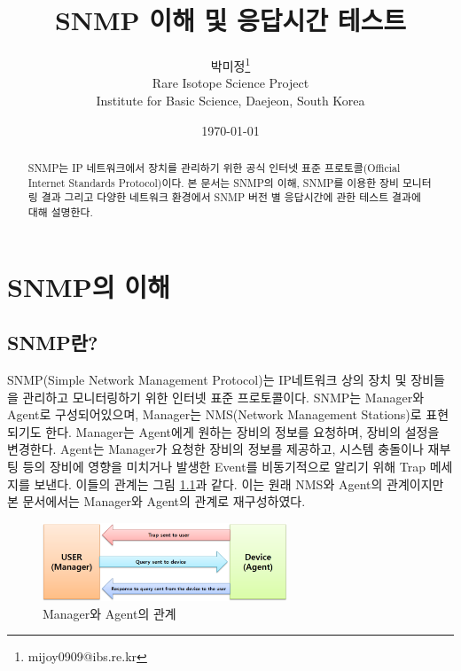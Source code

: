 \documentclass[11pt
  , a4paper
  , article
  , oneside
]{memoir}
\begin{document}
\newcommand{\technumber}{
  RAON Control-Document Series\\
  Revision : v1.0,   Release : Jan. 02. 2015}
\title{\textbf{SNMP 이해 및 응답시간 테스트}}

\author{박미정\thanks{mijoy0909@ibs.re.kr} \\

  Rare Isotope Science Project\\
  Institute for Basic Science, Daejeon, South Korea
}
\date{\today}

\renewcommand{\maketitlehooka}{\begin{flushright}\textsf{\technumber}\end{flushright}}

\maketitle

\begin{abstract}
SNMP는 IP 네트워크에서 장치를 관리하기 위한 공식 인터넷 표준 프로토콜(Official Internet Standards Protocol)\citep{oisp}이다. 본 문서는 SNMP의 이해, SNMP를 이용한 장비 모니터링 결과 그리고 다양한 네트워크 환경에서 SNMP 버전 별 응답시간에 관한 테스트 결과에 대해 설명한다. 
\end{abstract}

\chapter{SNMP의 이해}
\section{SNMP란?}

SNMP(Simple Network Management Protocol)는 IP네트워크 상의 장치 및 장비들을 관리하고 모니터링하기 위한 인터넷 표준 프로토콜이다. SNMP는 Manager와 Agent로 구성되어있으며, Manager는 NMS(Network Management Stations)로 표현되기도 한다. Manager는 Agent에게 원하는 장비의 정보를 요청하며, 장비의 설정을 변경한다. Agent는 Manager가 요청한 장비의 정보를 제공하고, 시스템 충돌이나 재부팅 등의 장비에 영향을 미치거나 발생한 Event를 비동기적으로 알리기 위해 Trap 메세지를 보낸다. 이들의 관계는 그림 \ref{fig:relationship_m_a}\citep{essential_snmp}과 같다. 이는 원래 NMS와 Agent의 관계이지만 본 문서에서는 Manager와 Agent의 관계로 재구성하였다.
\begin{figure}[h!]
  \centering
  \includegraphics[width=0.65\textwidth]{./images/relationship_m_a.eps}
  \caption{Manager와 Agent의 관계}
  \label{fig:relationship_m_a}   
\end{figure}
\end{document}
